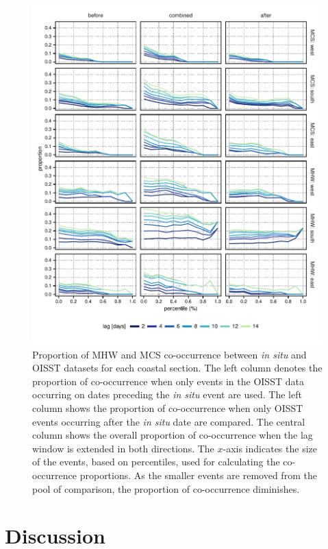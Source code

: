 \documentclass[a4paper,10pt,review]{elsarticle}
\begin{document}
\begin{figure}
\centering \includegraphics[width=1.0\textwidth]{figure5.pdf}
\caption{Proportion of MHW and MCS co-occurrence between \emph{in situ} and OISST datasets for each coastal section. The left column denotes the proportion of co-occurrence when only events in the OISST data occurring on dates preceding the \emph{in situ} event are used. The left column shows the proportion of co-occurrence when only OISST events occurring after the \emph{in situ} date are compared. The central column shows the overall proportion of co-occurrence when the lag window is extended in both directions. The $x$-axis indicates the size of the events, based on percentiles, used for calculating the co-occurrence proportions. As the smaller events are removed from the pool of comparison, the proportion of co-occurrence diminishes.} \label{fig:Figure5}
\end{figure}

\section{Discussion}
\end{document}
